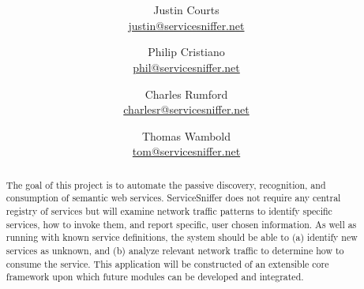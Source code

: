 \documentclass[titlepage]{article}
\title{\textbf{\mytitle}}
\author{
    Justin Courts \\\url{justin@servicesniffer.net}
    \and Philip Cristiano \\\url{phil@servicesniffer.net}
    \and Charles Rumford \\\url{charlesr@servicesniffer.net}
    \and Thomas Wambold \\\url{tom@servicesniffer.net}
}
\date{\mydate}
\begin{document}

\begin{figure}
    \vspace{-6em}
    \centering
    \vspace{-4em}
\end{figure}

\maketitle

\begin{abstract}
The goal of this project is to automate the passive discovery, recognition,
and consumption of semantic web services.  ServiceSniffer does not require any
central registry of services but will examine network traffic patterns to
identify specific services, how to invoke them, and report specific, user
chosen information.  As well as running with known service definitions, the
system should be able to (a) identify new services as unknown, and (b) analyze
relevant network traffic to determine how to consume the service.  This
application will be constructed of an extensible core framework upon which
future modules can be developed and integrated.
\end{abstract}

\pagebreak

\begin{versionhistory}
\end{versionhistory}

\pagebreak

\setcounter{tocdepth}{4}
\tableofcontents
\pagebreak
{}


%
%
\end{document}
